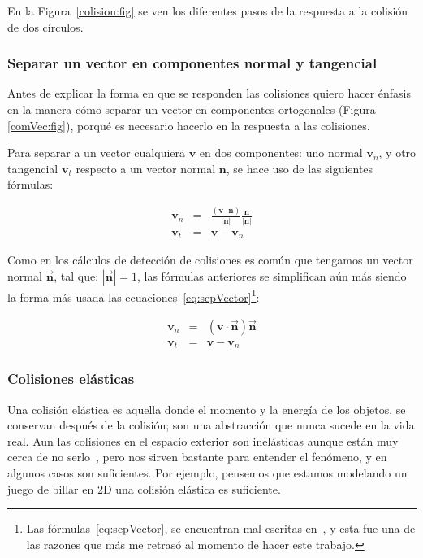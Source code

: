 En la Figura~\ref{colision:fig} se ven los diferentes pasos de la respuesta a la colisión de dos círculos.

\subsubsection{Separar un vector en componentes normal y tangencial}

Antes de explicar la forma en que se responden las colisiones quiero hacer énfasis en la manera cómo separar un vector en componentes ortogonales (Figura \ref{comVec:fig}), porqué es necesario hacerlo en la respuesta a las colisiones.

Para separar a un vector cualquiera $\textbf{v}$ en dos componentes: uno normal $\textbf{v}_n$, y otro tangencial $\textbf{v}_t$ respecto a un vector normal $\textbf{n}$, se hace uso de las siguientes fórmulas:

\begin{eqnarray}
\textbf{v}_n & = &\frac{(\textbf{v} \cdot \textbf{n})}{|\textbf{n}|} \frac{\textbf{n}}{|\textbf{n}|} \nonumber \\
\textbf{v}_t & = & \textbf{v} - \textbf{v}_n \nonumber
\end{eqnarray}

Como en los cálculos de detección de colisiones es común que tengamos un vector normal $\vec{\textbf{n}}$, tal que: $|\vec{\textbf{n}}| = 1$, las fórmulas anteriores se simplifican aún más siendo la forma más usada las ecuaciones~\eqref{eq:sepVector}\footnote{Las fórmulas~\eqref{eq:sepVector}, se encuentran mal escritas en~\cite{BaraffWitkin:Coursenotes}, y esta fue una de las razones que más me retrasó al momento de hacer este trabajo.}:

\begin{eqnarray}
\textbf{v}_n & = &(\textbf{v} \cdot \vec{\textbf{n}}) \vec{\textbf{n}} \nonumber \\
\textbf{v}_t & = & \textbf{v} - \textbf{v}_n
\label{eq:sepVector} 
\end{eqnarray}

\subsubsection{Colisiones elásticas}

Una colisión elástica es aquella donde el momento y la energía de los objetos, se conservan después de la colisión; son una abstracción que nunca sucede en la vida real.
Aun las colisiones en el espacio exterior son inelásticas aunque están muy cerca de no serlo~\cite{FisicaMatematicasVideojuegos}, pero nos sirven bastante para entender el fenómeno, y en algunos casos son suficientes.
Por ejemplo, pensemos que estamos modelando un juego de billar en 2D una colisión elástica es suficiente.

